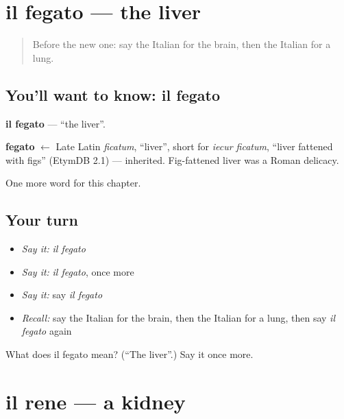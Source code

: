 \section[il fegato]{il fegato — the liver}

\label{lesson:IT-C151-fegato}



\begin{quote}
Before the new one: say the Italian for the brain, then the Italian for a lung.
\end{quote}

\subsection*{You'll want to know: il fegato}
\textbf{il fegato} — \textquotedblleft{}the liver\textquotedblright{}.

\begin{cousinweb}
\textbf{fegato} $\leftarrow$ Late Latin \emph{ficatum}, \textquotedblleft{}liver\textquotedblright{}, short for \emph{iecur ficatum}, \textquotedblleft{}liver fattened with figs\textquotedblright{} (EtymDB 2.1) — inherited. Fig-fattened liver was a Roman delicacy.
\end{cousinweb}

\begin{grammarlens}[title={What you've built}]
One more word for this chapter.
\end{grammarlens}

\subsection*{Your turn}
\begin{itemize}
\raggedright
  \item \emph{Say it:} \emph{il fegato}
  \item \emph{Say it:} \emph{il fegato}, once more
  \item \emph{Say it:} say \emph{il fegato}
  \item \emph{Recall:} say the Italian for the brain, then the Italian for a lung, then say \emph{il fegato} again
\end{itemize}

\begin{tcolorbox}[breakable,colback=teal!4,colframe=teal!35!black,title={Before you move on}]
What does il fegato mean? (\textquotedblleft{}The liver\textquotedblright{}.) Say it once more.
\end{tcolorbox}
\section[il rene]{il rene — a kidney}


